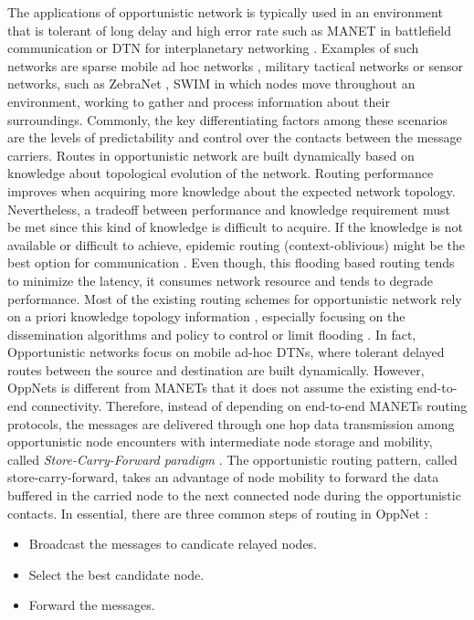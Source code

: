 %
The applications of opportunistic network is typically used in an environment that is tolerant of long delay and high error rate such as MANET in battlefield communication \cite{Alspaugh2004} or DTN for interplanetary networking \cite{Jenkins2010}. 
%
Examples of such networks are sparse mobile ad hoc networks \cite{Alekeish2012}, military tactical networks \cite{Scott2005,Kerdsri2013} or sensor networks, such as ZebraNet \cite{zebranet2004}, SWIM \cite{Small2003}  in which nodes move throughout an environment, working to gather and process information about their surroundings.
Commonly, the key differentiating factors among these scenarios are the levels of predictability and control over the contacts between the message carriers\cite{Karkkainen2013}.
%
Routes in opportunistic network are built dynamically based on knowledge about topological evolution of the network. 
%
Routing performance improves when acquiring more knowledge about the expected network topology. 
%
Nevertheless, a tradeoff between performance and knowledge requirement must be met since this kind of knowledge is difficult to acquire. 
%
If the knowledge is not available or difficult to achieve, epidemic routing (context-oblivious) might be the best option for communication \cite{bonaldo2011}.
%
Even though, this flooding based routing tends to minimize the latency, it consumes network resource and tends to degrade performance. 
%
Most of the existing routing schemes for opportunistic network rely on a priori knowledge topology information \cite{Pelusi2006}, especially focusing on the dissemination algorithms and policy to control or limit flooding \cite{Plymoth2010}.
%
In fact, Opportunistic networks focus on mobile ad-hoc DTNs, where tolerant delayed routes between the source and destination are built dynamically.
%
However, OppNets is different from MANETs that it does not assume the existing end-to-end connectivity.
%
Therefore, instead of depending on end-to-end MANETs routing protocols, the messages are delivered through one hop data transmission among opportunistic node encounters with intermediate node storage and mobility, called \textit{Store-Carry-Forward paradigm} \cite{Hu2009,Yamamura2011}. 
%
The opportunistic routing pattern, called store-carry-forward, takes an advantage of node mobility to forward the data buffered in the carried node to the next connected node during the opportunistic contacts. 
In essential, there are three common steps of routing in OppNet \cite{Hsu2011}:
\begin{itemize}
	\item Broadcast the messages to candicate relayed nodes.
	\item Select the best candidate node.
	\item Forward the messages.
\end{itemize}


